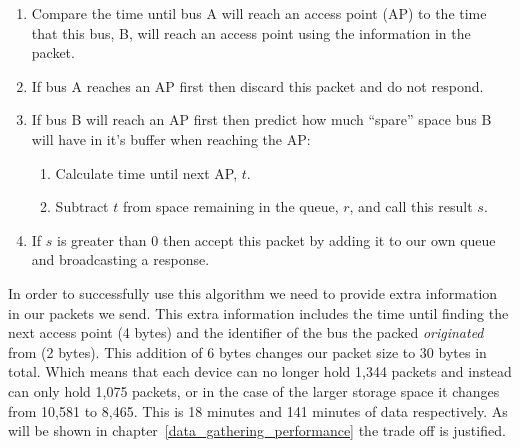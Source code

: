         \begin{enumerate}
            \item Compare the time until bus A will reach an access point (AP) to the time that this bus, B, will reach an access point using the information in the packet.
            \item If bus A reaches an AP first then discard this packet and do not respond.
            \item If bus B will reach an AP first then predict how much ``spare'' space bus B will have in it's buffer when reaching the AP:
                \begin{enumerate}
                    \item Calculate time until next AP, $t$.
                    \item Subtract $t$ from space remaining in the queue, $r$, and call this result $s$.
                \end{enumerate}
            \item If $s$ is greater than 0 then accept this packet by adding it to our own queue and broadcasting a response.
        \end{enumerate}

        In order to successfully use this algorithm we need to provide extra information in our packets we send. This extra information includes the time until finding the next access point (4 bytes) and the identifier of the bus the packed \emph{originated} from (2 bytes). This addition of 6 bytes changes our packet size to 30 bytes in total. Which means that each device can no longer hold 1,344 packets and instead can only hold 1,075 packets, or in the case of the larger storage space it changes from 10,581 to 8,465. This is 18 minutes and 141 minutes of data respectively. As will be shown in chapter~\ref{data_gathering_performance} the trade off is justified. 

